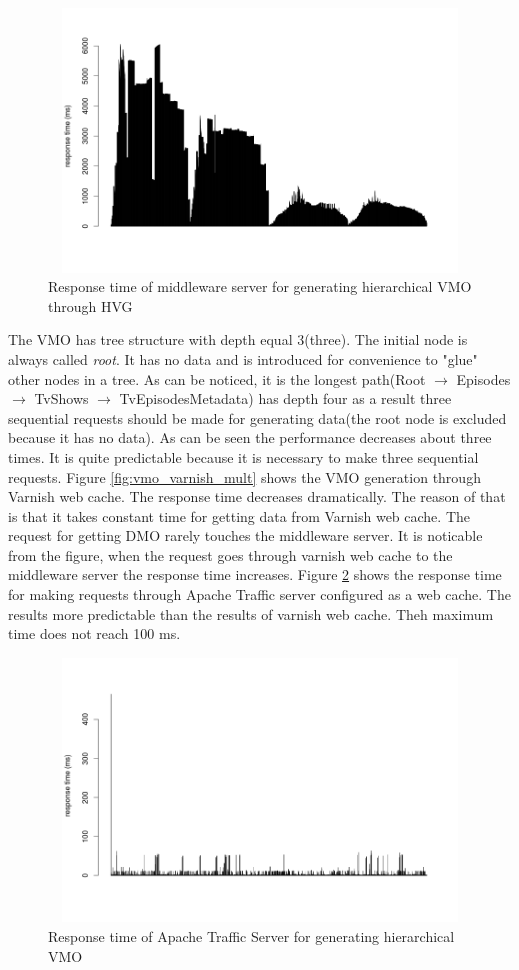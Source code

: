 \begin{figure}[h!]
    \centering
    \includegraphics[width=15cm,height=7cm,keepaspectratio]{images/vmo_hvg.png}
    \caption{Response time of middleware server for generating hierarchical VMO through HVG}
    \label{fig:vmo_hvg}
\end{figure}


The VMO has tree structure with depth equal 3(three). The initial node is always called \textit{root}. It has no data and is introduced for convenience to "glue" other nodes in a tree. As can be noticed, it is the longest path(Root $\rightarrow$ Episodes $\rightarrow$ TvShows $\rightarrow$ TvEpisodesMetadata) has depth four as a result three sequential requests should be made for generating data(the root node is excluded because it has no data). As can be seen the performance decreases about three times. It is quite predictable because it is necessary to make three sequential requests. Figure \ref{fig:vmo_varnish_mult} shows the VMO generation through Varnish web cache. The response time decreases dramatically. The reason of that is that it takes constant time for getting data from Varnish web cache. The request for getting DMO rarely touches the middleware server. It is noticable from the figure, when the request goes through varnish web cache to the middleware server the response time increases. Figure \ref{fig:vmo_ts_mult} shows the response time for making requests through Apache Traffic server configured as a web cache. The results more predictable than the results of varnish web cache. Theh maximum time does not reach 100 ms.  

\begin{figure}[h!]
    \centering
    \includegraphics[width=15cm,height=7cm,keepaspectratio]{images/vmo_ts_mult.png}
    \caption{Response time of Apache Traffic Server for generating hierarchical VMO}
    \label{fig:vmo_ts_mult}
\end{figure}

